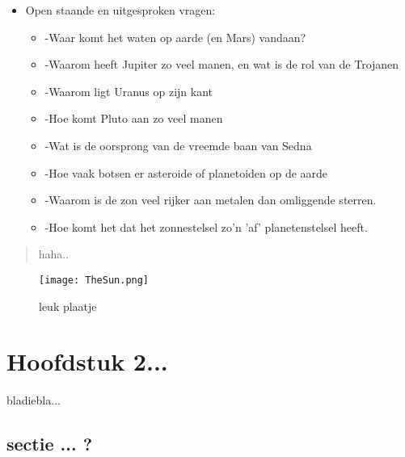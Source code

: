 \documentclass[11pt,fleqn]{book} %
\begin{document}
\begin{itemize}
\item Open staande en uitgesproken vragen:
  \begin{itemize}
  \item -Waar komt het waten op aarde (en Mars) vandaan?
  \item -Waarom heeft Jupiter zo veel manen, en wat is de rol van de Trojanen
  \item -Waarom ligt Uranus op zijn kant
  \item -Hoe komt Pluto aan zo veel manen
  \item -Wat is de oorsprong van de vreemde baan van Sedna
  \item -Hoe vaak botsen er asteroide of planetoiden op de aarde
  \item -Waarom is de zon veel rijker aan metalen dan omliggende sterren.
  \item -Hoe komt het dat het zonnestelsel zo'n 'af' planetenstelsel heeft.
  \end{itemize}
\end{itemize}

\begin{quote}
haha..
\end{quote}

\begin{figure}[h]
    \centering
    \texttt{[image: TheSun.png]}
    \caption{leuk plaatje}
    \label{fig:pca}
\end{figure}




\chapter{Hoofdstuk 2...}

bladiebla...

\section{sectie ... ?}
\end{document}
